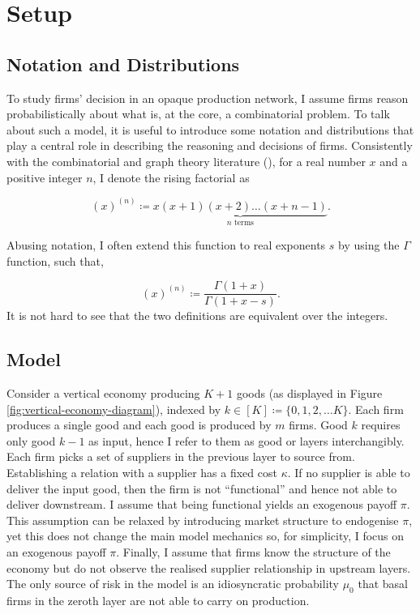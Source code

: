 \documentclass[../../main.tex]{subfiles}
\begin{document}
\section{Setup}

\subsection{Notation and Distributions}

To study firms' decision in an opaque production network, I assume firms reason probabilistically about what is, at the core, a combinatorial problem. To talk about such a model, it is useful to introduce some notation and distributions that play a central role in describing the reasoning and decisions of firms. Consistently with the combinatorial and graph theory literature (\cite{harris_combinatorics_2008}), for a real number $x$ and a positive integer $n$, I  denote the rising factorial as

\begin{equation}
  (x)^{(n)} \coloneqq \underbrace{x(x + 1)(x + 2)\ldots(x + n - 1)}_{n \text{ terms}}.
\end{equation}

Abusing notation, I  often extend this function to real exponents $s$ by using the $\Gamma$ function, such that,

\begin{equation}
  (x)^{(n)} \coloneqq \frac{\Gamma(1 + x)}{\Gamma(1 + x - s)}.
\end{equation} It is not hard to see that the two definitions are equivalent over the integers.


\subsection{Model}

Consider a vertical economy producing $K + 1$ goods (as displayed in Figure \ref{fig:vertical-economy-diagram}), indexed by $k \in [K] \coloneqq \{ 0, 1, 2, \ldots K \}$. Each firm produces a single good and each good is produced by $m$ firms. Good $k$ requires only good $k - 1$ as input, hence I  refer to them as good or layers interchangibly. Each firm picks a set of suppliers in the previous layer to source from. Establishing a relation with a supplier has a fixed cost $\kappa$. If no supplier is able to deliver the input good, then the firm is not ``functional'' and hence not able to deliver downstream. I assume that being functional yields an exogenous payoff $\pi$. This assumption can be relaxed by introducing market structure to endogenise $\pi$, yet this does not change the main model mechanics so, for simplicity, I  focus on an exogenous payoff $\pi$. Finally, I assume that firms know the structure of the economy but do not observe the realised supplier relationship in upstream layers. The only source of risk in the model is an idiosyncratic probability $\mu_0$ that basal firms in the zeroth layer are not able to carry on production.
\end{document}
